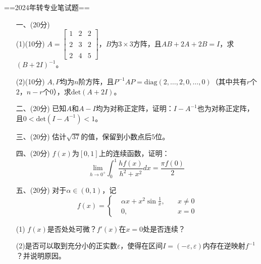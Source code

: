 ==2024年转专业笔试题==
\begin{enumerate}
\item[一、(20分)]
\\

(1)(10分) $A=\begin{bmatrix} 1 & 2 & 2 \\ \\2 & 3 & 2 \\ \\2 & 4 & 5 \end{bmatrix}$，$B$为$3\times 3$方阵，且$AB+2A+2B=I$，求$(B+2I)^{-1}$。
    
(2)(10分) $A,P$均为$n$阶方阵，且$P^{-1}AP=\text{diag}(2,\dots,2,0,\dots,0)$（其中共有$r$个$2$，$n-r$个$0$），求$\text{det}(A+2I)$。

\item[二、(20分)]
已知$A$和$A-I$均为对称正定阵，证明：$I-A^{-1}$也为对称正定阵，且$0<\text{det}(I-A^{-1})<1$。
\item[三、(20分)]
估计$\sqrt{37}$的值，保留到小数点后$5$位。
\item[四、(20分)]
$f(x)$为$[0,1]$上的连续函数，证明：
$$
\underset{h\to 0^+}{\text{lim}}\int_0^1\frac{hf(x)}{h^2+x^2}dx=\frac{\pi f(0)}{2}
$$
\item[五、(20分)]
对于$\alpha\in(0,1)$，记
\[
f(x)=\left\{
\begin{aligned}
    &\alpha x+x^2\sin{\frac{1}{x}},\quad &x\neq0\\
    &0,&x=0
\end{aligned}
\right.
\]

(1) $f(x)$是否处处可微？$f'(x)$在$x=0$处是否连续？

(2)是否可以取到充分小的正实数$\varepsilon$，使得在区间$I=(-\varepsilon,\varepsilon)$内存在逆映射$f^{-1}$？并说明原因。

\end{enumerate}

